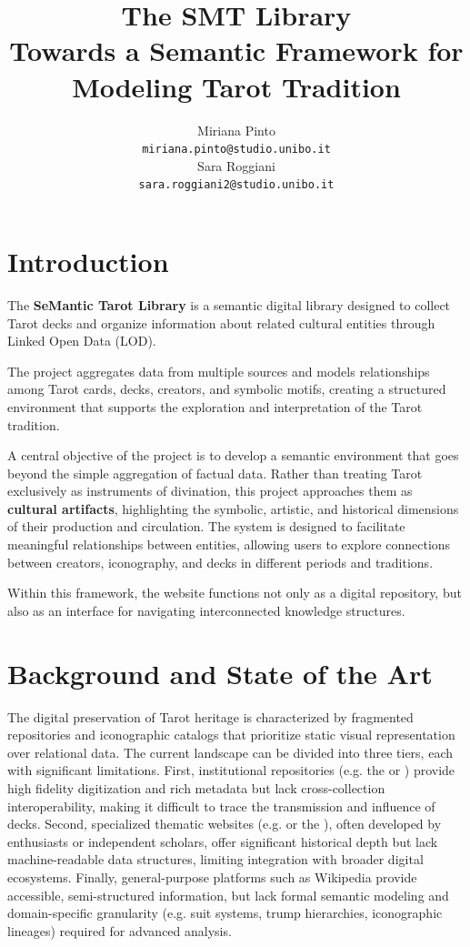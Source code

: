 \documentclass[11pt]{article}
\title{
  \LARGE The SMT Library \\[0.4em]
  \large Towards a Semantic Framework for Modeling Tarot Tradition
}
\author{
  Miriana Pinto \\
    {\small\tt miriana.pinto@studio.unibo.it} \\\And
  Sara Roggiani \\
    {\small\tt sara.roggiani2@studio.unibo.it} \\
 }
\begin{document}
\maketitle

\section{Introduction}
The \textbf{SeMantic Tarot Library} is a semantic digital library designed to collect Tarot decks and organize information about related cultural entities through Linked Open Data (LOD).

The project aggregates data from multiple sources and models relationships among Tarot cards, decks, creators, and symbolic motifs, creating a structured environment that supports the exploration and interpretation of the Tarot tradition.

A central objective of the project is to develop a semantic environment that goes beyond the simple aggregation of factual data. Rather than treating Tarot exclusively as instruments of divination, this project approaches them as \textbf{cultural artifacts}, highlighting the symbolic, artistic, and historical dimensions of their production and circulation. The system is designed to facilitate meaningful relationships between entities, allowing users to explore connections between creators, iconography, and decks in different periods and traditions. 

Within this framework, the website functions not only as a digital repository, but also as an interface for navigating interconnected knowledge structures.

\section{Background and State of the Art}
The digital preservation of Tarot heritage is characterized by fragmented repositories and iconographic catalogs that prioritize static visual representation over relational data. The current landscape can be divided into three tiers, each with significant limitations. First, institutional repositories (e.g. the  or ) provide high fidelity digitization and rich metadata but lack cross-collection interoperability, making it difficult to trace the transmission and influence of decks. Second, specialized thematic websites (e.g.  or the ), often developed by enthusiasts or independent scholars, offer significant historical depth but lack machine-readable data structures, limiting integration with broader digital ecosystems. Finally, general-purpose platforms such as Wikipedia provide accessible, semi-structured information, but lack formal semantic modeling and domain-specific granularity (e.g. suit systems, trump hierarchies, iconographic lineages) required for advanced analysis.
\end{document}
